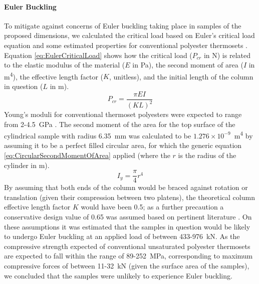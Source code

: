 \paragraph{Euler Buckling}
To mitigate against concerns of Euler buckling taking place in samples of
 the proposed dimensions, we calculated the critical load based on
 Euler's critical load equation and some estimated properties for
 conventional polyester thermosets \autocite{Euler1744}.
Equation \ref{eq:EulerCriticalLoad} shows how the critical load 
 (\(P_{cr}\) in \unit{\newton}) is related to the elastic modulus of the
 material (\(E\) in \unit{\pascal}), the second moment of area (\(I\) in
 \unit{\metre^{4}}),
 the effective length factor (\(K\), unitless), and the initial length of
 the column in question (\(L\) in \unit{\metre}).
\begin{equation}\label{eq:EulerCriticalLoad}
    P_{cr}=\frac{\pi EI}{(KL)^2}
\end{equation}
Young's moduli for conventional thermoset polyesters were expected to range
 from 2-4.5~\unit{\giga\pascal} \autocite{Lawrence1960}.
The second moment of the area for the top surface of the cylindrical sample
 with radius 6.35~\unit{\milli\metre} was calculated to be
 \(1.276\times10^{-9}\)~\unit{\metre^{4}} by assuming it to be a perfect
 filled circular area, for which the generic equation
 \ref{eq:CircularSecondMomentOfArea} applied (where the \(r\) is the
 radius of the cylinder in \unit{\metre}).
\begin{equation}\label{eq:CircularSecondMomentOfArea}
    I_{y}=\frac{\pi}{4}r^{4}
\end{equation}
By assuming that both ends of the column would be braced against rotation
 or translation (given their compression between two platens), the
 theoretical column effective length factor \(K\) would have been 0.5; as a
 further precaution a conservative design value of 0.65 was assumed
 based on pertinent literature \autocite{AISC1989}.
On these assumptions it was estimated that the samples in question would
 be likely to undergo Euler buckling at an applied load of between 
 433-976~\unit{\kilo\newton}.
As the compressive strength expected of conventional unsaturated
 polyester thermosets are expected to fall within the range of
 89-252~\unit{\mega\pascal}, corresponding to maximum compressive
 forces of between 11-32~\unit{\kilo\newton} (given the surface area of
 the samples), we concluded that the samples were unlikely to
 experience Euler buckling.

